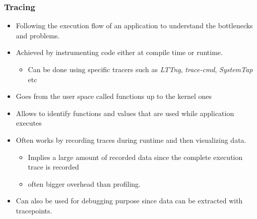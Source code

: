 \begin{frame}
  \frametitle{Tracing}
  \begin{itemize}
    \item Following the execution flow of an application to understand the
          bottlenecks and problems.
    \item Achieved by instrumenting code either at compile time or runtime.
    \begin{itemize}
      \item Can be done using specific tracers such as {\em LTTng},
            {\em trace-cmd}, {\em SystemTap} etc
    \end{itemize}
    \item Goes from the user space called functions up to the kernel ones
    \item Allows to identify functions and values that are used while
          application executes
    \item Often works by recording traces during runtime and then visualizing
          data.
    \begin{itemize}
      \item Implies a large amount of recorded data since the complete execution
            trace is recorded
      \item often bigger overhead than profiling.
    \end{itemize}
    \item Can also be used for debugging purpose since data can be extracted
          with tracepoints.
  \end{itemize}
\end{frame}
